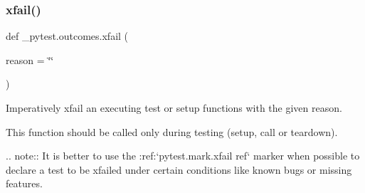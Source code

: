 \subsubsection{\texorpdfstring{xfail()}{xfail()}}
{\footnotesize\ttfamily def \+\_\+pytest.\+outcomes.\+xfail (\begin{DoxyParamCaption}\item[{}]{reason = {\ttfamily \char`\"{}\char`\"{}} }\end{DoxyParamCaption})}

\begin{DoxyVerb}Imperatively xfail an executing test or setup functions with the given reason.

This function should be called only during testing (setup, call or teardown).

.. note::
    It is better to use the :ref:`pytest.mark.xfail ref` marker when possible to declare a test to be
    xfailed under certain conditions like known bugs or missing features.
\end{DoxyVerb}
 